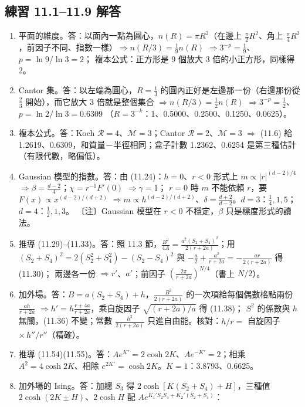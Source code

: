 \subsection{練習 11.1--11.9 解答}
{\small
\begin{enumerate}[label=\textbf{11.\arabic*},itemsep=0.05em]
\item 平面的維度。\quad 答：以面內一點為圓心，$n(R)=\pi R^2$（在邊上 $\frac\pi2R^2$、角上 $\frac\pi4R^2$，前因子不同、指數一樣）$\Rightarrow n(R/3)=\frac19n(R)$ $\Rightarrow3^{-p}=\frac19$、$p=\ln9/\ln3=2$；
複本公式：正方形是 9 個放大 3 倍的小正方形，同樣得 2。
\item Cantor 集。\quad 答：以左端為圓心，$R=\frac13$ 的圓內正好是左邊那一份（右邊那份從 $\frac23$ 開始），而它放大 3 倍就是整個集合 $\Rightarrow n(R/3)=\frac12n(R)$ $\Rightarrow3^{-p}=\frac12$、$p=\ln2/\ln3=0.6309$
（$R=3^{-k}$：1、0.5000、0.2500、0.1250、0.0625）。
\item 複本公式。\quad 答：Koch $\mathcal R=4$、$\mathcal M=3$；Cantor $\mathcal R=2$、$\mathcal M=3$ $\Rightarrow$ (11.6) 給 1.2619、0.6309，和質量－半徑相同；盒子計數 1.2362、0.6254 是第三種估計（有限代數，略偏低）。
\item Gaussian 模型的指數。\quad 答：由 (11.24)：$h=0$、$r<0$ 形式上 $m\propto|r|^{(d-2)/4}$ $\Rightarrow\beta=\frac{d-2}4$；$\chi=r^{-1}F'(0)$ $\Rightarrow\gamma=1$；
$r=0$ 時 $m$ 不能依賴 $r$，要 $F(x)\propto x^{(d-2)/(d+2)}$ $\Rightarrow m\propto h^{(d-2)/(d+2)}$、$\delta=\frac{d+2}{d-2}$。$d=3$：$\frac14,1,5$；$d=4$：$\frac12,1,3$。
〔注〕Gaussian 模型在 $r<0$ 不穩定，$\beta$ 只是標度形式的讀法。
\item 推導 (11.29)--(11.33)。\quad 答：照 11.3 節，$\frac{B^2}{4A}=\frac{a^2(S_2+S_4)^2}{2(r+2a)}$；用 $(S_2+S_4)^2=2(S_2^2+S_4^2)-(S_2-S_4)^2$ 與 $-\frac a2+\frac{a^2}{r+2a}=-\frac{ar}{2(r+2a)}$ 得 (11.30)；
兩邊各一份 $\Rightarrow r'$、$a'$；前因子 $(\frac{2\pi}{r+2a})^{N/4}$（書上 $N/2$）。
\item 加外場。\quad 答：$B=a(S_2+S_4)+h$，$\frac{B^2}{2(r+2a)}$ 的一次項給每個偶數格點兩份 $\frac{ah}{r+2a}$ $\Rightarrow h'=h\frac{r+4a}{r+2a}$，乘自旋因子 $\sqrt{(r+2a)/a}$ 得 (11.38)；
$S^2$ 的係數與 $h$ 無關，(11.36) 不變；常數 $\frac{h^2}{2(r+2a)}$ 只進自由能。核對：$h/r=$ 自旋因子 $\times\,h''/r''$（精確）。
\item 推導 (11.54)(11.55)。\quad 答：$Ae^{K'}=2\cosh2K$、$Ae^{-K'}=2$；相乘 $A^2=4\cosh2K$、相除 $e^{2K'}=\cosh2K$。$K=1$：3.8793、0.6625。
\item 加外場的 Ising。\quad 答：加總 $S_3$ 得 $2\cosh[K(S_2+S_4)+H]$，三種值 $2\cosh(2K\pm H)$、$2\cosh H$ 配 $Ae^{K_1'S_2S_4+K_2'(S_2+S_4)}$：

\end{enumerate}}
